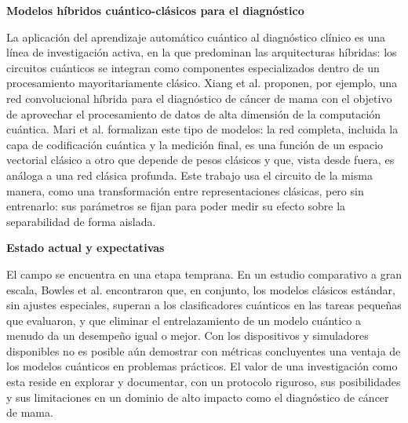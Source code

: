 \textbf{Modelos híbridos cuántico-clásicos para el diagnóstico}

La aplicación del aprendizaje automático cuántico al diagnóstico clínico es una línea de
investigación activa, en la que predominan las arquitecturas híbridas: los circuitos cuánticos se
integran como componentes especializados dentro de un procesamiento mayoritariamente clásico. Xiang
et al. \cite{Xiang2024QuantumCNN} proponen, por ejemplo, una red convolucional híbrida para el
diagnóstico de cáncer de mama con el objetivo de aprovechar el procesamiento de datos de alta
dimensión de la computación cuántica. Mari et al. \cite{Mari2020Transfer} formalizan este tipo de
modelos: la red completa, incluida la capa de codificación cuántica y la medición final, es una
función de un espacio vectorial clásico a otro que depende de pesos clásicos y que, vista desde
fuera, es análoga a una red clásica profunda. Este trabajo usa el circuito de la misma manera, como
una transformación entre representaciones clásicas, pero sin entrenarlo: sus parámetros se fijan para
poder medir su efecto sobre la separabilidad de forma aislada.

\textbf{Estado actual y expectativas}

El campo se encuentra en una etapa temprana. En un estudio comparativo a gran escala, Bowles et al.
\cite{Bowles2024Benchmarking} encontraron que, en conjunto, los modelos clásicos estándar, sin ajustes
especiales, superan a los clasificadores cuánticos en las tareas pequeñas que evaluaron, y que eliminar el
entrelazamiento de un modelo cuántico a menudo da un desempeño igual o mejor. Con los dispositivos y
simuladores disponibles no es posible aún demostrar con métricas concluyentes una ventaja de los
modelos cuánticos en problemas prácticos. El valor de una investigación como esta reside en explorar
y documentar, con un protocolo riguroso, sus posibilidades y sus limitaciones en un dominio de alto
impacto como el diagnóstico de cáncer de mama.

